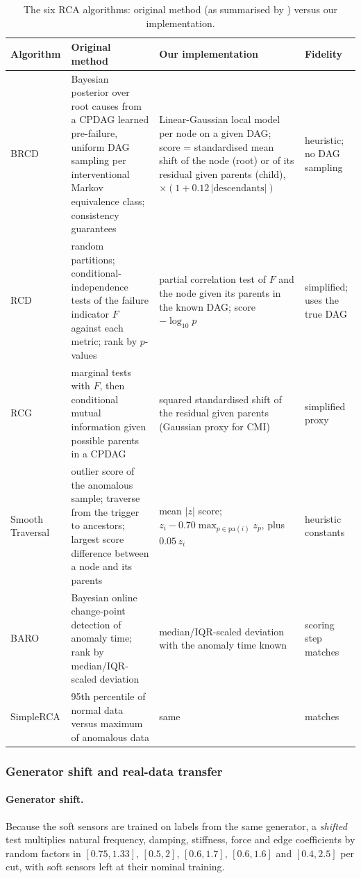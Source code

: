\documentclass[11pt]{article}
\begin{document}
\begin{table}[t]\centering\footnotesize
\caption{The six RCA algorithms: original method (as summarised by \citealt{lee2026brcd}) versus our implementation.}\label{tab:algs}
\begin{tabular}{p{1.8cm}p{4.4cm}p{5.2cm}p{2.1cm}}\toprule
Algorithm & Original method & Our implementation & Fidelity\\\midrule
BRCD \citep{lee2026brcd} & Bayesian posterior over root causes from a CPDAG learned pre-failure, uniform DAG sampling per interventional Markov equivalence class; consistency guarantees & Linear-Gaussian local model per node on a given DAG; score = standardised mean shift of the node (root) or of its residual given parents (child), $\times(1+0.12\,|\text{descendants}|)$ & heuristic; no DAG sampling\\
RCD \citep{ikram2022rcd} & random partitions; conditional-independence tests of the failure indicator $F$ against each metric; rank by $p$-values & partial correlation test of $F$ and the node given its parents in the known DAG; score $-\log_{10}p$ & simplified; uses the true DAG\\
RCG \citep{ikram2025rcg} & marginal tests with $F$, then conditional mutual information given possible parents in a CPDAG & squared standardised shift of the residual given parents (Gaussian proxy for CMI) & simplified proxy\\
Smooth Traversal \citep{orchard2025} & outlier score of the anomalous sample; traverse from the trigger to ancestors; largest score difference between a node and its parents & mean $|z|$ score; $z_i-0.70\max_{p\in\text{pa}(i)}z_p$, plus $0.05\,z_i$ & heuristic constants\\
BARO \citep{pham2024baro} & Bayesian online change-point detection of anomaly time; rank by median/IQR-scaled deviation & median/IQR-scaled deviation with the anomaly time known & scoring step matches\\
SimpleRCA \citep{fang2025simplerca} & 95th percentile of normal data versus maximum of anomalous data & same & matches\\\bottomrule
\end{tabular}
\end{table}

\subsubsection{Generator shift and real-data transfer}
\paragraph{Generator shift.} Because the soft sensors are trained on labels from the same generator, a \emph{shifted} test multiplies natural frequency, damping, stiffness, force and edge coefficients by random factors in $[0.75,1.33]$, $[0.5,2]$, $[0.6,1.7]$, $[0.6,1.6]$ and $[0.4,2.5]$ per cut, with soft sensors left at their nominal training.
\end{document}
